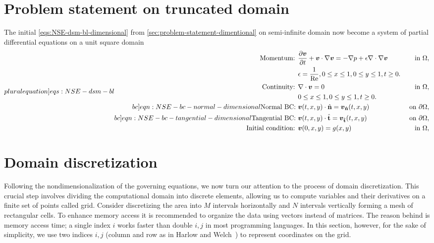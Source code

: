 \documentclass{article}
\numberwithin{equation}{section}
\begin{document}
\section{Problem statement on truncated domain}\label{sec:problem-statement-nondimensional}
The initial \cref{eqs:NSE-dsm-bl-dimensional} from \cref{sec:problem-statement-dimentional} on semi-infinite domain now become a system of partial differential equations on a unit square domain 
\begin{subequations}
\label[pluralequation]{eqs:NSE-dsm-bl}
\begin{align}
\label{eqn:momentum}
\text{Momentum: }	&\frac{\partial \boldsymbol{v}}{\partial t} + \boldsymbol{v} \cdot \nabla \boldsymbol{v} = -\nabla p + \epsilon \nabla \cdot \nabla \boldsymbol{v} \quad&\text{ in }\Omega, \\ 
					&\epsilon = \frac{1}{\operatorname{Re}},0\leq x \leq 1, 0\leq y \leq 1, t\geq0.\notag\\
\label{eqn:continuity-dsm-bl}
\text{Continuity: }	& \nabla \cdot \boldsymbol{v} = 0 \quad&\text{ in }\Omega, \\ 
					&0\leq x \leq 1, 0\leq y \leq 1, t\geq0. \notag\\
\label[bc]{eqn:NSE-bc-normal-dimensional}
\text{Normal BC: } & \boldsymbol{v}(t,x,y)\cdot\hat{\mathbf{n}}=\boldsymbol{v}_\mathbf{\hat{n}}(t,x,y) \quad&\text{ on }\partial\Omega, \\
\label[bc]{eqn:NSE-bc-tangential-dimensional}
\text{Tangential BC: } & \boldsymbol{v}(t,x,y)\cdot\hat{\mathbf{t}}=\boldsymbol{v}_\mathbf{\hat{t}}(t,x,y) \quad&\text{ on }\partial\Omega, \\
\label{eqn:NSE-ic-dimensional}
\text{Initial condition: } &\boldsymbol{v}(0,x,y)=g(x,y) \quad&\text{ in }\Omega,
\end{align}
\end{subequations}

\section{Domain discretization}\label{sec:domain-discretization}
Following the nondimensionalization of the governing equations, we now turn our attention to the process of domain discretization. This crucial step involves dividing the computational domain into discrete elements, allowing us to compute variables and their derivatives on a finite set of points called grid. Consider discretizing the area into $M$ intervals horizontally and $N$ intervals vertically forming a mesh of rectangular cells. To enhance memory access it is recommended to organize the data using vectors instead of matrices. 
The reason behind is memory access time; a single index $i$ works faster than double $i,j$ in most programming languages. In this section, however, for the sake of simplicity, we use two indices $i,j$ (column and row as in Harlow and Welch~\cite{Harlow:1965}) to represent coordinates on the grid.
\end{document}
